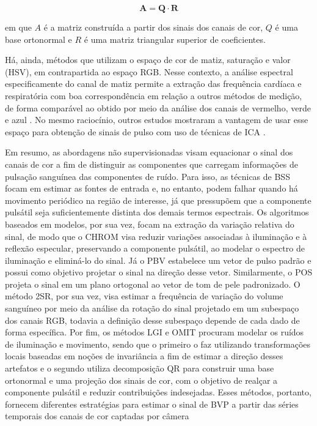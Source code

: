 \begin{equation}
    \label{eq:omit}
    \bm{A} = \bm{Q} \cdot \bm{R} 
\end{equation}

em que \(A\) é a matriz construída a partir dos sinais dos canais de cor, \(Q\) é uma base ortonormal e \(R\) é uma matriz triangular superior de coeficientes. 

Há, ainda, métodos que utilizam o espaço de cor de matiz, saturação e valor (HSV), em contrapartida ao espaço RGB. Nesse contexto, a análise espectral especificamente do canal de matiz permite a extração das frequência cardíaca e respiratória com boa correspondência em relação a outros métodos de medição, de forma comparável ao obtido por meio da análise dos canais de vermelho, verde e azul \cite{sanyal2018algorithms}. No mesmo raciocínio, outros estudos mostraram a vantagem de usar esse espaço para obtenção de sinais de pulso com uso de técnicas de ICA \cite{tsouri2015benefits}.

Em resumo, as abordagens não supervisionadas visam equacionar o sinal dos canais de cor a fim de distinguir as componentes que carregam informações de pulsação sanguínea das componentes de ruído. Para isso, as técnicas de BSS focam em estimar as fontes de entrada e, no entanto, podem falhar quando há movimento periódico na região de interesse, já que pressupõem que a componente pulsátil seja suficientemente distinta dos demais termos espectrais. Os algoritmos baseados em modelos, por sua vez, focam na extração da variação relativa do sinal, de modo que o CHROM visa reduzir variações associadas à iluminação e à reflexão especular, preservando a componente pulsátil, ao modelar o espectro de iluminação e eliminá-lo do sinal. Já o PBV estabelece um vetor de pulso padrão e possui como objetivo projetar o sinal na direção desse vetor. Similarmente, o POS projeta o sinal em um plano ortogonal ao vetor de tom de pele padronizado. O método 2SR, por sua vez, visa estimar a frequência de variação do volume sanguíneo por meio da análise da rotação do sinal projetado em um subespaço dos canais RGB, todavia a definição desse subespaço depende de cada dado de forma específica. Por fim, os métodos LGI e OMIT procuram modelar os ruídos de iluminação e movimento, sendo que o primeiro o faz utilizando transformações locais baseadas em noções de invariância a fim de estimar a direção desses artefatos e o segundo utiliza decomposição QR para construir uma base ortonormal e uma projeção dos sinais de cor, com o objetivo de realçar a componente pulsátil e reduzir contribuições indesejadas. Esses métodos, portanto, fornecem diferentes estratégias para estimar o sinal de BVP a partir das séries temporais dos canais de cor captadas por câmera 

